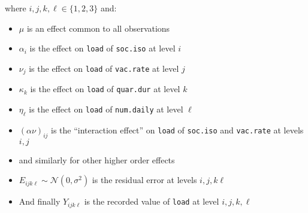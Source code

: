 \documentclass[12pt,a4paper]{article}
\begin{document}
where $i,j,k,\ell\in\{1,2,3\}$ and:

\vspace*{-3mm}
\begin{center}
    \begin{minipage}{0.8\textwidth}
		\begin{itemize}
			\item $\mu$ is an effect common to all observations
			\vspace*{-3mm}
			\item $\alpha_i$ is the effect on \verb`load` of \verb`soc.iso` at level $i$
			\vspace*{-3mm}
			\item $\nu_j$ is the effect on \verb`load` of \verb`vac.rate` at level $j$
			\vspace*{-3mm}
			\item $\kappa_k$ is the effect on \verb`load` of \verb`quar.dur` at level $k$
			\vspace*{-3mm}
			\item $\eta_\ell$ is the effect on \verb`load` of \verb`num.daily` at level $\ell$
			\vspace*{-3mm}
			\item $(\alpha\nu)_{ij}$ is the ``interaction effect'' on \verb`load` of \verb`soc.iso` and \verb`vac.rate` at levels $i,j$
			\vspace*{-3mm}
			\item and similarly for other higher order effects
			\vspace*{-3mm}
			\item $E_{ijk\ell}\sim\mathcal{N}(0,\sigma^2)$ is the residual error at levels $i,j,k\ell$
			\vspace*{-3mm}
			\item And finally $Y_{ijk\ell}$ is the recorded value of \verb`load` at level $i,j,k,\ell$
		\end{itemize}
	\end{minipage}
\end{center}



\end{document}

